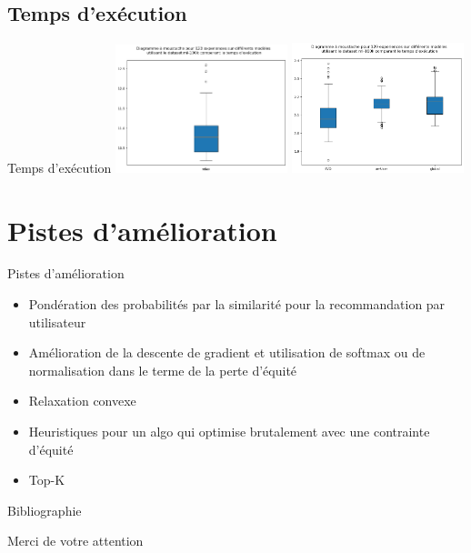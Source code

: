 \documentclass{beamer}
\begin{document}
\subsection{Temps d'exécution}
\begin{frame}{Temps d'exécution}
  \includegraphics[width = 5cm]{t1}
  \includegraphics[width = 5cm]{t2}
\end{frame}
\section{Pistes d'amélioration}
\begin{frame}{Pistes d'amélioration}
  \begin{itemize}
    \item Pondération des probabilités par la similarité pour la recommandation par utilisateur
    \item Amélioration de la descente de gradient et utilisation de softmax ou de normalisation dans le terme de la perte d'équité
    \item Relaxation convexe
    \item Heuristiques pour un algo qui optimise brutalement avec une contrainte d'équité
    \item Top-K
  \end{itemize}
\end{frame}
\nocite{toward,netflixmoney,yao2017parity,pleiss2017fairness}
\begin{frame}{Bibliographie}
  
  
\end{frame}
\begin{frame}
  Merci de votre attention
\end{frame}
\end{document}
